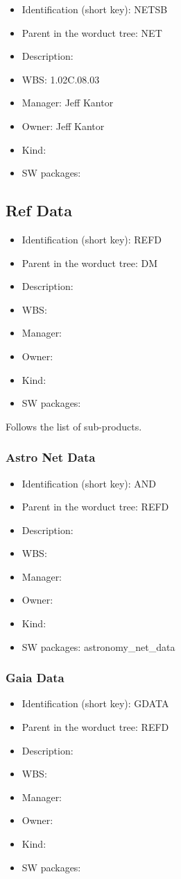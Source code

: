 \begin{itemize}\item Identification (short key): NETSB
\item Parent in the worduct tree: NET
\item Description: 
\item WBS: 1.02C.08.03
\item Manager: Jeff Kantor
\item Owner: Jeff Kantor
\item Kind:
\item SW packages: 
\end{itemize}\subsection{Ref Data}
\begin{itemize}\item Identification (short key): REFD
\item Parent in the worduct tree: DM
\item Description: 
\item WBS: 
\item Manager: 
\item Owner: 
\item Kind:
\item SW packages: 
\end{itemize}Follows the list of sub-products.\subsubsection{Astro Net Data}
\begin{itemize}\item Identification (short key): AND
\item Parent in the worduct tree: REFD
\item Description: 
\item WBS: 
\item Manager: 
\item Owner: 
\item Kind:
\item SW packages: astronomy\_net\_data
\end{itemize}\subsubsection{Gaia Data}
\begin{itemize}\item Identification (short key): GDATA
\item Parent in the worduct tree: REFD
\item Description: 
\item WBS: 
\item Manager: 
\item Owner: 
\item Kind:
\item SW packages: 
\end{itemize}
